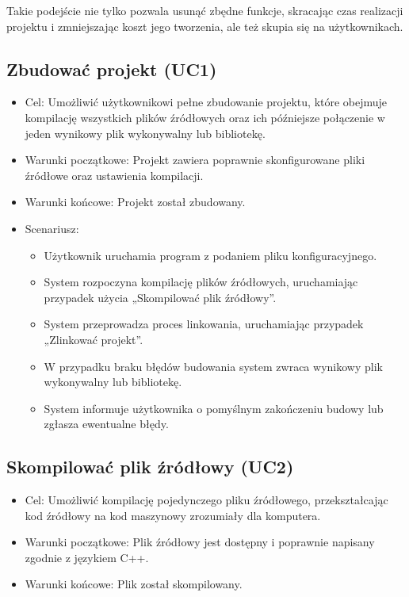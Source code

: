 Takie podejście nie tylko pozwala usunąć zbędne funkcje, skracając czas realizacji projektu i zmniejszając koszt jego tworzenia, ale też skupia się na użytkownikach.

\subsection{Zbudować projekt (UC1)}
\begin{itemize}
    \item Cel: Umożliwić użytkownikowi pełne zbudowanie projektu, które obejmuje kompilację wszystkich plików źródłowych oraz ich późniejsze połączenie w jeden wynikowy plik wykonywalny lub bibliotekę.
    \item Warunki początkowe: Projekt zawiera poprawnie skonfigurowane pliki źródłowe oraz ustawienia kompilacji.
    \item Warunki końcowe: Projekt został zbudowany.
    \item Scenariusz: 
    \begin{itemize}
    	\item Użytkownik uruchamia program z podaniem pliku konfiguracyjnego.
    	\item System rozpoczyna kompilację plików źródłowych, uruchamiając przypadek użycia „Skompilować plik źródłowy”.
    	\item System przeprowadza proces linkowania, uruchamiając przypadek „Zlinkować projekt”.
    	\item W przypadku braku błędów budowania system zwraca wynikowy plik wykonywalny lub bibliotekę.
    	\item System informuje użytkownika o pomyślnym zakończeniu budowy lub zgłasza ewentualne błędy.
    \end{itemize}
\end{itemize}

\subsection{Skompilować plik źródłowy (UC2)}
\begin{itemize}
    \item Cel: Umożliwić kompilację pojedynczego pliku źródłowego, przekształcając kod źródłowy na kod maszynowy zrozumiały dla komputera.
    \item Warunki początkowe: Plik źródłowy jest dostępny i poprawnie napisany zgodnie z językiem C++.
    \item Warunki końcowe: Plik został skompilowany.
\end{itemize}


